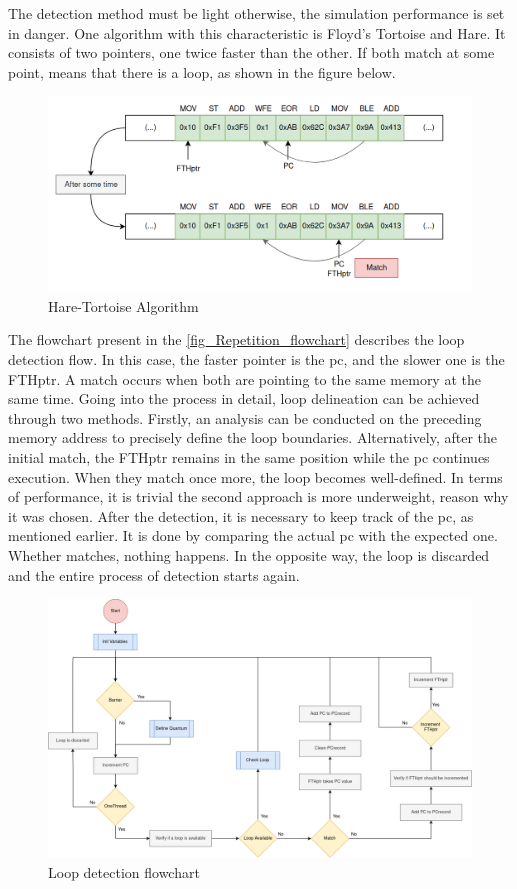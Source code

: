 The detection method must be light otherwise, the simulation performance is set in danger. One algorithm with this characteristic is Floyd's 
Tortoise and Hare. It consists of two pointers, one twice faster than the other. If both match at some point, means that there is a 
loop, as shown in the figure below.

\begin{figure}[H]
	\centering
 	\includegraphics[width=0.8\linewidth]{Images/FTH_algorithm.png}
 	\caption{Hare-Tortoise Algorithm}
	 \label{fig_FTH_algorithm}
\end{figure}

The flowchart present in the \autoref{fig_Repetition_flowchart} describes the loop detection flow. 
In this case, the faster pointer is the \gls{pc}, and the slower one is the FTHptr. A match occurs when both are pointing to the same memory at 
the same time. Going into the process in detail, loop delineation can be achieved through two methods. Firstly, an analysis can be conducted on 
the preceding memory address to precisely define the loop boundaries. Alternatively, after the initial match, the FTHptr remains in the same position 
while the \gls{pc} continues execution. When they match once more, the loop becomes well-defined. In terms of performance, it is trivial the 
second approach is more underweight, reason why it was chosen. After the detection, it is necessary to keep track of the \gls{pc}, as mentioned 
earlier. It is done by comparing the actual \gls{pc} with the expected one. Whether matches, nothing happens. In the opposite way, the loop is 
discarded and the entire process of detection starts again.

\begin{figure}[h!]
	\centering
 	\includegraphics[width=0.9\linewidth]{Images/Repetition_flowchart.png}
 	\caption{Loop detection flowchart}
	 \label{fig_Repetition_flowchart}
\end{figure}


